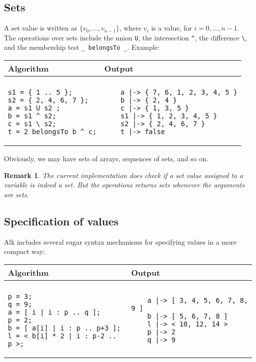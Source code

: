 \documentclass[a4paper]{report}
\newtheorem*{remark}{Remark}
\begin{document}
\subsection{Sets}

A set value is written as $\{ v_0,\ldots,v_{n-1}\}$, where $v_i$ is a value, for $i=0,\ldots,n-1$. The operations over sets include the union \verb|U|, the intersection \verb|^|, the difference \verb|\|, and the membership test \verb|_ belongsTo _|.
Example:
\begin{center}
\begin{tabular}{ll}
Algorithm & Output\\
\hline
\\
\begin{minipage}{.45\textwidth}
\begin{verbatim}
s1 = { 1 .. 5 };
s2 = { 2, 4, 6, 7 };
a = s1 U s2 ;
b = s1 ^ s2;
c = s1 \ s2;
t = 2 belongsTo b ^ c;
\end{verbatim}
\end{minipage}
&
\begin{minipage}{.45\textwidth}
\begin{verbatim}
    a |-> { 7, 6, 1, 2, 3, 4, 5 }
    b |-> { 2, 4 }
    c |-> { 1, 3, 5 }
    s1 |-> { 1, 2, 3, 4, 5 }
    s2 |-> { 2, 4, 6, 7 }
    t |-> false
\end{verbatim}
\end{minipage}
\end{tabular}
\end{center}

Obviously, we may have sets of arrays, sequences of sets, and so on.

\begin{remark}
The current implementation does check if a set value assigned to a variable is indeed a set. But the operations returns sets whenever the arguments are sets.
\end{remark}

\subsection{Specification of values}

Alk includes several sugar syntax mechanisms for specifying values in a more compact way:
\begin{center}
\begin{tabular}{ll}
Algorithm & Output\\
\hline
\\
\begin{minipage}{.45\textwidth}
\begin{verbatim}
p = 3;
q = 9;
a = [ i | i : p .. q ];
p = 2;
b = [ a[i] | i : p .. p+3 ];
l = < b[i] * 2 | i : p-2 .. p >;
\end{verbatim}
\end{minipage}
&
\begin{minipage}{.45\textwidth}
\begin{verbatim}
    a |-> [ 3, 4, 5, 6, 7, 8, 9 ]
    b |-> [ 5, 6, 7, 8 ]
    l |-> < 10, 12, 14 >
    p |-> 2
    q |-> 9
\end{verbatim}
\end{minipage}
\end{tabular}
\end{center}
\end{document}
